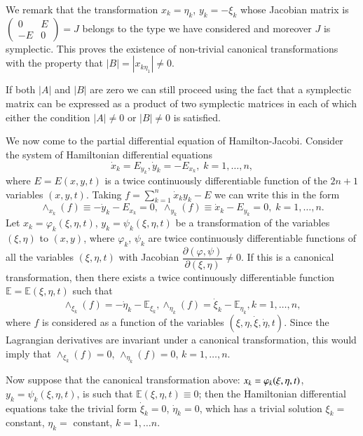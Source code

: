 We remark that the transformation $x_k = \eta_k$, $y_k = - \xi_k$ whose Jacobian matrix is $\left(\begin{smallmatrix} 
0 & E \\ -E & 0 \end{smallmatrix}\right) = J$ belongs to the type we have considered and moreover $J$ is symplectic. This proves the existence of non-trivial canonical transformations with the property that $|B| = |x_{k\eta_1} | \neq 0$.
 
If both $|A|$ and $|B|$ are zero we can still proceed using the fact that a symplectic matrix can be expressed as a product of two symplectic matrices in each of which either the condition $|A| \neq 0$ or $|B| \neq 0$ is satisfied.

We now come to the partial differential equation of Hamilton-Jacobi. Consider the system of Hamiltonian differential equations
$$
\dot{x}_k = E_{y_k}, \dot{y}_k = - E_{x_k}, \; k = 1, \ldots, n,
$$
where $E = E(x,y,t)$ is a twice continuously differentiable function of the $2n+1$ variables $(x,y, t)$. Taking $f = \sum\limits^n_{k=1} \dot{x}_k y_k - E$ we can write this in the form 
$$
\wedge_{x_k} (f) \equiv - \dot{y}_k - E_{x_k} = 0, \; \wedge_{y_k} (f) \equiv \dot{x}_k - E_{y_k}  = 0, \; k =1, \ldots, n.
$$\pageoriginale 
Let $x_k = \varphi_k(\xi, \eta, t)$, $y_k = \psi_k(\xi, \eta, t)$ be a transformation of the variables $(\xi, \eta)$ to $(x,y)$, where $\varphi_k$, $\psi_k$ are twice continuously differentiable functions of all the variables $(\xi, \eta, t)$ with Jacobian $\dfrac{\partial (\varphi, \psi)}{\partial(\xi, \eta)} \neq 0$. If this is a canonical transformation, then there exists a twice continuously differentiable function $\mathbb{E} = \mathbb{E}(\xi, \eta, t)$ such that
$$
\wedge_{\xi_k} (f) = - \dot{\eta}_k - \mathbb{E}_{\xi_k}, \wedge_{\eta_k}(f) = \dot{\xi}_k - \mathbb{E}_{\eta_k}, k =1 , \ldots, n, 
$$
where $f$ is considered as a function of the variables $(\xi, \eta, \dot{\xi}, \dot{\eta}, t)$. Since the Lagrangian derivatives are invariant under a canonical transformation, this would imply that $\wedge_{\xi_k} (f) = 0$, $\wedge_{\eta_k} (f) = 0$, $k=1, \ldots,n$.

Now suppose that the canonical transformation above:
$x_k = \varphi_k(\xi,\break \eta, t)$, $y_k = \psi_k (\xi, \eta, t)$, is such that $\mathbb{E} (\xi, \eta, t) \equiv 0$; then the Hamiltonian differential equations take the trivial form $\dot{\xi}_k  = 0$, $\dot{\eta}_k =0$, which has a trivial solution $\xi_k = $ constant, $\eta_k = $ constant, $k=1, \ldots n$.


